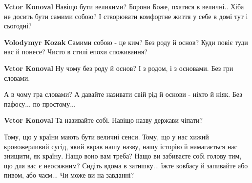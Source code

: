 \begin{itemize}
\begin{itemize}
\textbf{Vctor Konoval} Навіщо бути великими? Борони Боже, пхатися в величні..
Хіба не досить бути самими собою? І створювати комфортне життя у себе в домі тут і сьогодні?

 
\textbf{Volodymyr Kozak} Самими собою - це ким? Без роду й основ? Куди повіє туди нас й понесе? Чисто в стилі епохи споживання?

 
\textbf{Vctor Konoval} Ну чому без роду й основ? І з родом, і з основами. Без гри словами.

 
А в чому гра словами? А давайте називати свій рід й основи - ніхто й ніяк. Без пафосу... по-простому...

 
\textbf{Vctor Konoval} Та називайте собі. Навіщо назву держави чіпати?

 

Тому, що у країни мають бути величні сенси. Тому, що у нас хижий кровожерливий
сусід, який вкрав нашу назву, нашу історію й намагається нас знищити, як
країну. Нащо воно вам треба? Нащо ви забиваєте собі голову тим, що для вас є
неосяжним? Сидіть вдома в затишку... їжте ковбасу й запивайте або пивом, або
чаєм... Чи може ви на завданні?



\end{itemize}
\end{itemize}
